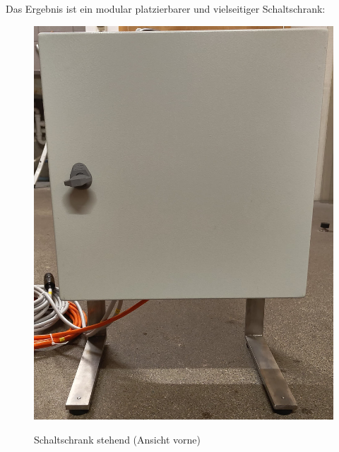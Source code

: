 Das Ergebnis ist ein modular platzierbarer und vielseitiger Schaltschrank:

\begin{figure}[H]
	\begin{minipage}[b]{.4\linewidth}
		\includegraphics[width=\linewidth]{../ref/Schaltschrank_stehend_vorne.jpeg}
		\label{fig:schaltschrankstehendvorne}
		\caption{Schaltschrank stehend (Ansicht vorne)}
	\end{minipage}
	\hspace{.1\linewidth}%
	\begin{minipage}[b]{.4\linewidth} %

\end{minipage}
\end{figure}
